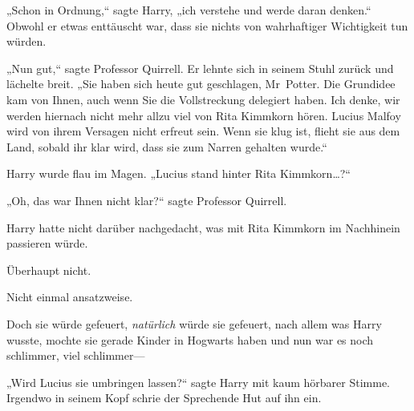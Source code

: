{%
„Schon in Ordnung,“ sagte Harry, „ich verstehe und werde daran denken.“ Obwohl er etwas enttäuscht war, dass sie nichts von wahrhaftiger Wichtigkeit tun würden.

„Nun gut,“ sagte Professor Quirrell. Er lehnte sich in seinem Stuhl zurück und lächelte breit. „Sie haben sich heute gut geschlagen, Mr~Potter. Die Grundidee kam von Ihnen, auch wenn Sie die Vollstreckung delegiert haben. Ich denke, wir werden hiernach nicht mehr allzu viel von Rita Kimmkorn hören. Lucius Malfoy wird von ihrem Versagen nicht erfreut sein. Wenn sie klug ist, flieht sie aus dem Land, sobald ihr klar wird, dass sie zum Narren gehalten wurde.“

Harry wurde flau im Magen. „Lucius stand hinter Rita Kimmkorn…?“

„Oh, das war Ihnen nicht klar?“ sagte Professor Quirrell.

Harry hatte nicht darüber nachgedacht, was mit Rita Kimmkorn im Nachhinein passieren würde.

Überhaupt nicht.

Nicht einmal ansatzweise.

Doch sie würde gefeuert, \emph{natürlich} würde sie gefeuert, nach allem was Harry wusste, mochte sie gerade Kinder in Hogwarts haben und nun war es noch schlimmer, viel schlimmer—

„Wird Lucius sie umbringen lassen?“ sagte Harry mit kaum hörbarer Stimme. Irgendwo in seinem Kopf schrie der Sprechende Hut auf ihn ein.

}
